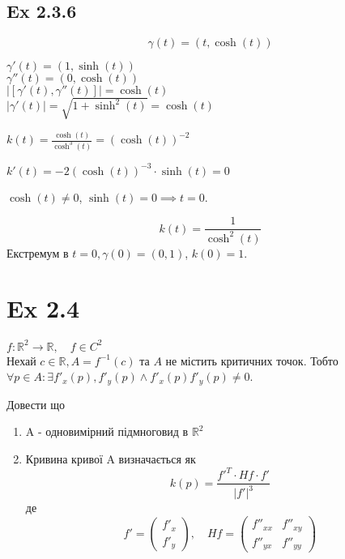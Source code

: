 \documentclass[10pt, a4paper]{article} %
\newcommand{\R}{\mathbb{R}}
\begin{document}
\newpage
\subsection*{Ex 2.3.6}
\[\gamma(t) = (t, \cosh(t))\]

$\gamma'(t) = (1, \sinh(t))$\\
$\gamma''(t) = (0, \cosh(t))$\\
$|[\gamma'(t), \gamma''(t)]| = \cosh(t)$\\
$|\gamma'(t)| = \sqrt{1+\sinh^2(t)} = \cosh(t)$

$k(t) = \frac{\cosh(t)}{\cosh^3(t)} = (\cosh(t))^{-2}$

$k'(t) = -2(\cosh(t))^{-3}\cdot \sinh(t) = 0$

$\cosh(t) \ne 0$, $\sinh(t) = 0 \implies t = 0$.

\begin{mdframed}[backgroundcolor=green!20]
    \[k(t) = \frac{1}{\cosh^2(t)}\]
    Екстремум в $t = 0, \gamma(0) = (0,1)$, $k(0)=1$.
\end{mdframed}



\section*{Ex 2.4}
\begin{mdframed}
    $f : \R^2 \to \R, \quad f\in C^2$\\
    Нехай $c\in \R, A = f^{-1}(c)$ та $A$ не містить критичних точок.
    Тобто $\forall p\in A: \exists f'_x(p), f'_y(p) \land f'_x(p)f'_y(p) \ne 0$.

    Довести що 
    \begin{enumerate}
        \item A - одновимірний підмноговид в $\R^2$
        \item Кривина кривої A визначається як
        \[k(p) = \frac{f'^T \cdot Hf \cdot f'}{|f'|^3}\]
        де
        \[f' = \begin{pmatrix}
            f'_x \\ f'_y
        \end{pmatrix}, \quad Hf = \begin{pmatrix}
            f''_{xx} & f''_{xy}\\ f''_{yx} & f''_{yy}
        \end{pmatrix}\]
    \end{enumerate}
\end{mdframed}
\end{document}
